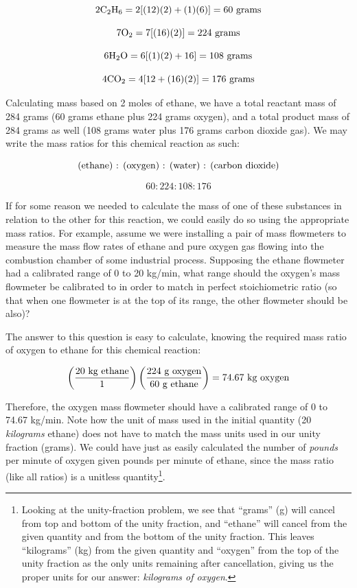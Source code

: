$$\hbox{2C}_2\hbox{H}_6 = 2[(12)(2) + (1)(6)] = 60 \hbox{ grams}$$

$$\hbox{7O}_2 = 7[(16)(2)] = 224 \hbox{ grams}$$

$$\hbox{6H}_2\hbox{O} = 6[(1)(2) + 16] = 108 \hbox{ grams}$$

$$\hbox{4CO}_2 = 4[12 + (16)(2)] = 176 \hbox{ grams}$$

Calculating mass based on 2 moles of ethane, we have a total reactant mass of 284 grams (60 grams ethane plus 224 grams oxygen), and a total product mass of 284 grams as well (108 grams water plus 176 grams carbon dioxide gas).  We may write the mass ratios for this chemical reaction as such:

$$\hbox{(ethane) : (oxygen) : (water) : (carbon dioxide)}$$

$$60:224:108:176$$

If for some reason we needed to calculate the mass of one of these substances in relation to the other for this reaction, we could easily do so using the appropriate mass ratios.  For example, assume we were installing a pair of mass flowmeters to measure the mass flow rates of ethane and pure oxygen gas flowing into the combustion chamber of some industrial process.  Supposing the ethane flowmeter had a calibrated range of 0 to 20 kg/min, what range should the oxygen's mass flowmeter be calibrated to in order to match in perfect stoichiometric ratio (so that when one flowmeter is at the top of its range, the other flowmeter should be also)?

The answer to this question is easy to calculate, knowing the required mass ratio of oxygen to ethane for this chemical reaction:

$$\left({20 \hbox{ kg ethane} \over 1}\right) \left({224 \hbox{ g oxygen} \over 60 \hbox{ g ethane}}\right) = 74.67 \hbox{ kg oxygen}$$

Therefore, the oxygen mass flowmeter should have a calibrated range of 0 to 74.67 kg/min.  Note how the unit of mass used in the initial quantity (20 \textit{kilograms} ethane) does not have to match the mass units used in our unity fraction (grams).  We could have just as easily calculated the number of \textit{pounds} per minute of oxygen given pounds per minute of ethane, since the mass ratio (like all ratios) is a unitless quantity\footnote{Looking at the unity-fraction problem, we see that ``grams'' (g) will cancel from top and bottom of the unity fraction, and ``ethane'' will cancel from the given quantity and from the bottom of the unity fraction.  This leaves ``kilograms'' (kg) from the given quantity and ``oxygen'' from the top of the unity fraction as the only units remaining after cancellation, giving us the proper units for our answer: \textit{kilograms of oxygen}.}.










